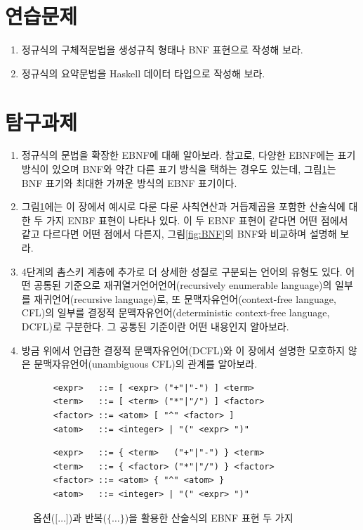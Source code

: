 \documentclass[b5paper,chapter,figtabcapt]{oblivoir}
\begin{document}
\section*{연습문제}
\begin{enumerate}
 \item 정규식의 구체적문법을 생성규칙 형태나 BNF 표현으로 작성해 보라.
 \item 정규식의 요약문법을 Haskell 데이터 타입으로 작성해 보라.
\end{enumerate}

\section*{탐구과제}
\begin{enumerate}
 \item 정규식의 문법을 확장한 EBNF에 대해 알아보라.
       참고로, 다양한 EBNF에는 표기 방식이 있으며 BNF와 약간 다른
       표기 방식을 택하는 경우도 있는데, 그림\;\ref{fig:EBNF}는
       BNF 표기와 최대한 가까운 방식의 EBNF 표기이다.
 \item 그림\;\ref{fig:EBNF}에는 이 장에서 예시로 다룬 다룬 사칙연산과
       거듭제곱을 포함한 산술식에 대한 두 가지 ENBF 표현이 나타나 있다.
       이 두 EBNF 표현이 같다면 어떤 점에서 같고 다르다면 어떤 점에서
       다른지, 그림\;\ref{fig:BNF}의 BNF와 비교하며 설명해 보라.
 \item 4단계의 촘스키 계층에 추가로 더 상세한 성질로 구분되는 언어의
      유형도 있다. 어떤 공통된 기준으로 재귀열거언어언어(recursively
      enumerable language)의 일부를 재귀언어(recursive language)로,
      또 문맥자유언어(context-free language, CFL)의 일부를 결정적
      문맥자유언어(deterministic context-free language, DCFL)로 구분한다.
      그 공통된 기준이란 어떤 내용인지 알아보라.
 \item 방금 위에서 언급한 결정적 문맥자유언어(DCFL)와 이 장에서 설명한
       모호하지 않은 문맥자유언어(unambiguous CFL)의 관계를 알아보라.
\end{enumerate}


\begin{figure}[b]
\begin{lstlisting}
    <expr>   ::= [ <expr> ("+"|"-") ] <term>
    <term>   ::= [ <term> ("*"|"/") ] <factor>
    <factor> ::= <atom> [ "^" <factor> ]
    <atom>   ::= <integer> | "(" <expr> ")"
\end{lstlisting}

\begin{lstlisting}
    <expr>   ::= { <term>   ("+"|"-") } <term>
    <term>   ::= { <factor> ("*"|"/") } <factor>
    <factor> ::= <atom> { "^" <atom> }
    <atom>   ::= <integer> | "(" <expr> ")"
\end{lstlisting}
\caption{옵션($\texttt{[}\ldots\texttt{]}$)과
         반복($\texttt{\{}\ldots\texttt{\}}$)을
         활용한 산술식의 EBNF 표현 두 가지
         \label{fig:EBNF}}
\end{figure}
\end{document}
